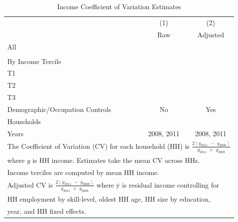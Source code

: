 \documentclass[12pt]{article}
\begin{document}
\begin{table}[H]
\centering
\caption{Income Coefficient of Variation Estimates}\label{table:cvcalc}
\vspace{-2mm}
\begin{tabular}{l*{1}{cc}}
\toprule
 & (1) & (2)  \\
  & Raw & Adjusted  \\ \midrule
All &  &  \\
\\
By Income Tercile \\
T1 &  &  \\ 
T2 &  &  \\ 
T3 &  &  \\ 
Demographic/Occupation Controls  & No & Yes \\
Households &  &  \\
Years & 2008, 2011 & 2008, 2011 \\
\bottomrule
\multicolumn{3}{l}{\footnotesize The Coefficient of Variation (CV) for each household (HH) is $ \frac{ 2 \mid y_{2011} \,\, - \,\, y_{2008} \mid  }{y_{2011} \,\,+\,\, y_{2008}}  $    } \\[-.3em]
\multicolumn{3}{l}{\footnotesize where $y$ is HH income. Estimates take the mean CV across HHs. } \\[-.5em]
\multicolumn{3}{l}{\footnotesize   Income terciles are computed by mean HH income.} \\[-.2em]
\multicolumn{3}{l}{\footnotesize   Adjusted CV is $ \frac{ 2 \mid \overline{y}_{2011} \,\, - \,\, \overline{y}_{2008} \mid  }{y_{2011} \,\,+\,\, y_{2008}}  $  where $\overline{\text{y}}$ is  residual income controlling for} \\[-.3em]
\multicolumn{3}{l}{\footnotesize  HH employment by skill-level, oldest HH age, HH size by education,  } \\[-.5em]
\multicolumn{3}{l}{\footnotesize year, and HH fixed effects.  } \\
\end{tabular}
\end{table}


\end{document}
